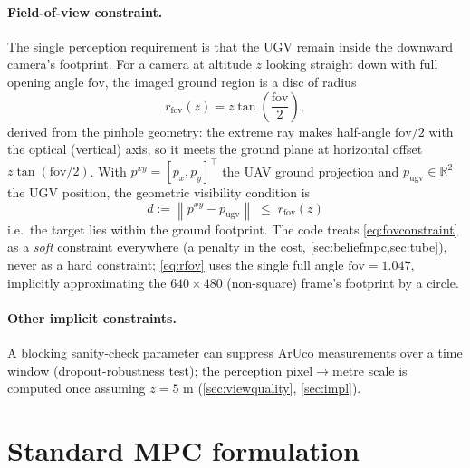 \documentclass[11pt]{article}
\newcommand{\R}{\mathbb{R}}
\newcommand{\norm}[1]{\left\lVert #1 \right\rVert}
\newcommand{\fov}{\mathrm{fov}}
\begin{document}
\paragraph{Field-of-view constraint.} The single perception requirement is that the UGV remain inside the
downward camera's footprint. For a camera at altitude $z$ looking straight down with full opening angle
$\fov$, the imaged ground region is a disc of radius
\begin{equation}
r_{\fov}(z) = z\tan\!\left(\frac{\fov}{2}\right),
\label{eq:rfov}
\end{equation}
derived from the pinhole geometry: the extreme ray makes half-angle $\fov/2$ with the optical (vertical)
axis, so it meets the ground plane at horizontal offset $z\tan(\fov/2)$. With $p^{xy}=[p_x,p_y]^\top$ the UAV
ground projection and $p_{\text{ugv}}\in\R^2$ the UGV position, the geometric visibility condition is
\begin{equation}
\boxed{\;d := \norm{p^{xy}-p_{\text{ugv}}} \;\le\; r_{\fov}(z)\;}
\label{eq:fovconstraint}
\end{equation}
i.e.\ the target lies within the ground footprint. The code treats \cref{eq:fovconstraint} as a \emph{soft}
constraint everywhere (a penalty in the cost, \cref{sec:beliefmpc,sec:tube}), never as a hard constraint;
\cref{eq:rfov} uses the single full angle $\fov=1.047$, implicitly approximating the $640\times480$
(non-square) frame's footprint by a circle.

\paragraph{Other implicit constraints.} A blocking sanity-check parameter can suppress ArUco measurements over
a time window (dropout-robustness test); the perception pixel$\to$metre scale is computed once assuming
$z=5$ m (\cref{sec:viewquality}, \cref{sec:impl}).

\section{Standard MPC formulation}
\label{sec:mpc}
\end{document}
